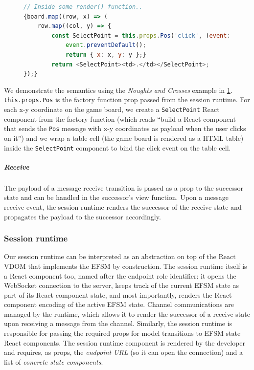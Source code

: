 \begin{figure}[!h]
\begin{lstlisting}[language=JavaScript, tabsize=4]
// Inside some render() function..
{board.map((row, x) => (
	row.map((col, y) => {
		const SelectPoint = this.props.Pos('click', (event: UIEvent) => {
			event.preventDefault();
			return { x: x, y: y };}
		return <SelectPoint><td>.</td></SelectPoint>;
});}
\end{lstlisting}
\label{lst:clientapp}
\end{figure}

We demonstrate the semantics using the \textit{Noughts and Crosses} example in
\cref{lst:clientapp}.
\texttt{this.props.Pos} is the factory function prop
passed from the session runtime.
For each x-y coordinate on the game board, we
create a \texttt{SelectPoint} React component from the factory function (which
reads ``build a React component that sends the \texttt{Pos} message with x-y
coordinates as payload when the user clicks on it'') and we wrap a table cell
(the game board is rendered as a HTML table) inside the \texttt{SelectPoint}
component to bind the click event on the table cell.

\subparagraph{Receive}
The payload of a message receive transition is passed as
a prop to the successor state and can be handled in the successor's view
function.
Upon a message receive event, the session runtime renders the
successor of the receive state and propagates the payload to the successor
accordingly.

\subsubsection{Session runtime}
\label{section:clientruntime}

Our session runtime can be interpreted as an abstraction on top of the React
VDOM that implements the EFSM by construction.
The session runtime itself is a React component too, named after the endpoint
role identifier:
it opens the WebSocket connection to the server, keeps track of the current
EFSM state as part of its React component state, and most importantly, renders
the React component encoding of the active EFSM state.
Channel communications are managed by the runtime, which allows it to render
the successor of a receive state upon receiving a message from the channel.
Similarly, the session runtime is responsible for passing the required props
for model transitions to EFSM state React components.
The session runtime component is rendered by the developer and requires, as
props, the \textit{endpoint URL} (so it can open the connection) and a list of
\textit{concrete state components}.

